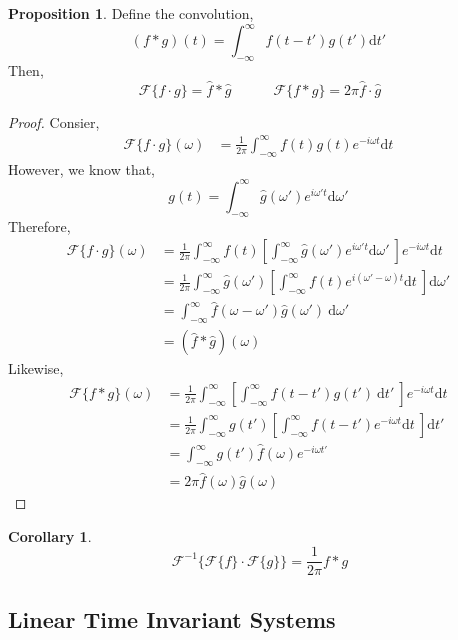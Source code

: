 \documentclass[12pt]{extarticle}
\renewcommand{\d}[1]{ \mathrm{d}#1 \:}
\theoremstyle{definition}
\newtheorem{proposition}[theorem]{Proposition}
\newtheorem{corollary}[theorem]{Corollary}
\newcommand{\F}{\mathcal{F}}
\begin{document}
\begin{proposition}
Define the convolution,
\[ (f * g)(t) = \int_{-\infty}^{\infty} f(t - t') g(t') \d{t'}  \]
Then,
\[ \F \{ f \cdot g \} = \hat{f} * \hat{g} \quad \quad \quad \F \{ f * g \} = 2 \pi \hat{f} \cdot \hat{g} \] 
\end{proposition}

\begin{proof}
Consier,
\begin{align*}
\F \{ f \cdot g \}(\omega) & = \frac{1}{2 \pi} \int_{-\infty}^\infty f(t) g(t) e^{-i \omega t} \d{t}
\end{align*}
However, we know that,
\[ g(t) = \int_{-\infty}^\infty \hat{g}(\omega') e^{i \omega' t} \d{\omega'} \]
Therefore,
\begin{align*}
\F \{ f \cdot g \}(\omega) & = \frac{1}{2 \pi} \int_{-\infty}^\infty f(t) \left[ \int_{-\infty}^\infty \hat{g}(\omega') e^{i \omega' t} \d{\omega'} \right] e^{-i \omega t} \d{t}
\\
& = \frac{1}{2 \pi} \int_{-\infty}^\infty \hat{g}(\omega') \left[ \int_{-\infty}^{\infty} f(t) e^{i (\omega' - \omega) t} \d{t} \right] \d{\omega'} 
\\
& =  \int_{-\infty}^\infty \hat{f}(\omega - \omega')  \hat{g}(\omega') \: \d{\omega'}
\\
& = (\hat{f} * \hat{g})(\omega)
\end{align*}
Likewise,
\begin{align*}
\F\{ f * g \}(\omega) & = \frac{1}{2 \pi} \int_{-\infty}^{\infty} \left[ \int_{-\infty}^{\infty} f(t - t') g(t') \: \d{t'} \right] e^{- i \omega t} \d{t}
\\
& = \frac{1}{2 \pi} \int_{-\infty}^{\infty} g(t') \left[ \int_{-\infty}^{\infty} f(t - t') e^{- i \omega t} \d{t} \right] \d{t'}
\\
& =  \int_{-\infty}^{\infty} g(t') \hat{f}(\omega) e^{-i \omega t'}
\\
& = 2 \pi \hat{f}(\omega) \hat{g}(\omega)
\end{align*}
\end{proof}

\begin{corollary}
\[ \F^{-1}\{ \F\{ f \} \cdot \F\{ g \} \} = \frac{1}{2\pi} f * g \]
\end{corollary}

\subsection{Linear Time Invariant Systems}
\end{document}
